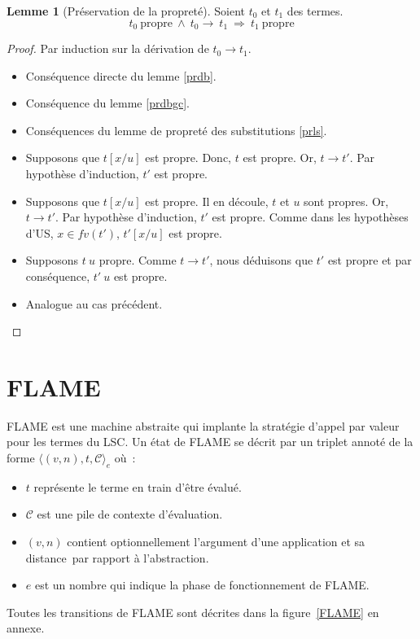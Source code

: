 \documentclass[11pt,a4paper]{article}
\theoremstyle{definition}
\newtheorem{lemma}[theorem]{Lemme}
\newcommand{\etat}[1]{\langle #1 \rangle}
\newcommand{\mcc}{\mathcal{C}}
\begin{document}
\begin{lemma}[Préservation de la propreté]
  Soient $t_0$ et $t_1$ des termes. 
  \[
    t_0~\text{propre}~\wedge~t_0\rightarrow~t_1~\Rightarrow~t_1~\text{propre}
  \]
\end{lemma}
\begin{proof}
  Par induction sur la dérivation de $t_0 \rightarrow t_1$.
  \begin{itemize}
    \item {} Conséquence directe du lemme \ref{prdb}. 
    \item {} Conséquence du lemme \ref{prdbgc}. 
    \item {} Conséquences du lemme de propreté des substitutions \ref{prls}.
    \item {} Supposons que $t[x/u]$ est propre. Donc, $t$ est propre. Or, $t \rightarrow t'$. Par hypothèse d'induction, $t'$ est propre.
    \item {} Supposons que $t[x/u]$ est propre. Il en découle, $t$ et $u$ sont propres. Or, $t \rightarrow t'$. Par hypothèse d'induction, $t'$ est propre.
      Comme dans les hypothèses d'US, $x \in fv(t')$, $t'[x/u]$ est propre.
    \item {} Supposons $t~u$ propre. Comme $t \rightarrow t'$, nous déduisons que $t'$ est propre et par conséquence, $t'~u$ est propre.
    \item {} Analogue au cas précédent.
  \end{itemize}
\end{proof}

\section{FLAME}
FLAME est une machine abstraite qui implante la stratégie d'appel par valeur pour les termes du LSC. 
Un état de FLAME se décrit par un triplet annoté de la forme $\etat{(v,n),t,\mcc}_e$ où~:
\begin{itemize}
  \item $t$ représente le terme en train d'être évalué.
  \item $\mcc$ est une pile de contexte d'évaluation.
    \item $(v, n)$ contient optionnellement l'argument d'une application et sa \og distance\fg~par rapport à l'abstraction.
    \item $e$ est un nombre qui indique la phase de fonctionnement de FLAME.
    \end{itemize} 
Toutes les transitions de FLAME sont décrites dans la figure~\ref{FLAME} en annexe.
\end{document}
